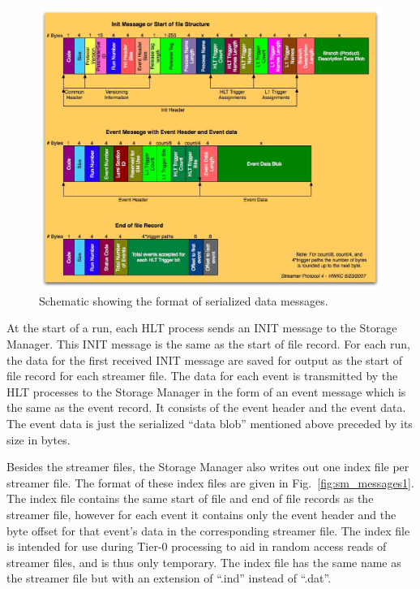 \begin{figure}[hbtp]
  \begin{center}
    \includegraphics[width=5.5in]{Software/sm_mess_structure.eps}
    \caption{Schematic showing the format of serialized data messages.}
    \label{fig:sm_mess_structure}
  \end{center}
\end{figure}

At the start of a run, each HLT process sends an INIT message to the Storage Manager.
This INIT message is the same as the start of file record. For each run, the data 
for the first received INIT message are saved for output as the start of file 
record for each streamer file. The data for each event is transmitted by the
HLT processes to the Storage Manager in the form of an event message which is
the same as the event record. It consists of the event header and the event
data. The event data is just the serialized ``data blob'' mentioned above
preceded by its size in bytes.

Besides the streamer files, the Storage Manager also writes out one index file
per streamer file. The format of these index files are given in Fig.~\ref{fig:sm_messages1}.
The index file contains the same start of file and end of file records as the streamer
file, however for each event it contains only the event header and the byte offset
for that event's data in the corresponding streamer file. The index file is intended
for use during Tier-0 processing to aid in random access reads of streamer files, and
is thus only temporary. The index file has the same name as the streamer file but with
an extension of ``.ind'' instead of ``.dat''.

